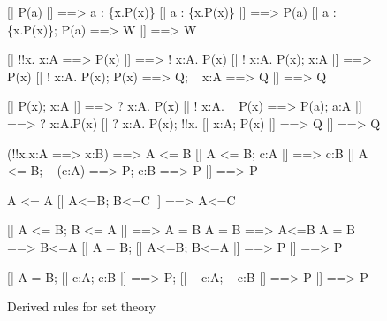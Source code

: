 \begin{figure} \underscoreon
\begin{ttbox}
        [| P(a) |] ==> a : \{x.P(x)\}
        [| a : \{x.P(x)\} |] ==> P(a)
        [| a : \{x.P(x)\};  P(a) ==> W |] ==> W

           [| !!x. x:A ==> P(x) |] ==> ! x:A. P(x)
           [| ! x:A. P(x);  x:A |] ==> P(x)
           [| ! x:A. P(x);  P(x) ==> Q;  ~ x:A ==> Q |] ==> Q

            [| P(x);  x:A |] ==> ? x:A. P(x)
           [| ! x:A. ~ P(x) ==> P(a);  a:A |] ==> ? x:A.P(x)
            [| ? x:A. P(x);  !!x. [| x:A; P(x) |] ==> Q  |] ==> Q

         (!!x.x:A ==> x:B) ==> A <= B
         [| A <= B;  c:A |] ==> c:B
        [| A <= B;  ~ (c:A) ==> P;  c:B ==> P |] ==> P

     A <= A
    [| A<=B;  B<=C |] ==> A<=C

       [| A <= B;  B <= A |] ==> A = B
      A = B ==> A<=B
      A = B ==> B<=A
       [| A = B;  [| A<=B; B<=A |] ==> P |]  ==>  P

      [| A = B;  [| c:A; c:B |] ==> P;  
                           [| ~ c:A; ~ c:B |] ==> P 
                |]  ==>  P
\end{ttbox}
\caption{Derived rules for set theory} \label{hol-set1}
\end{figure}


